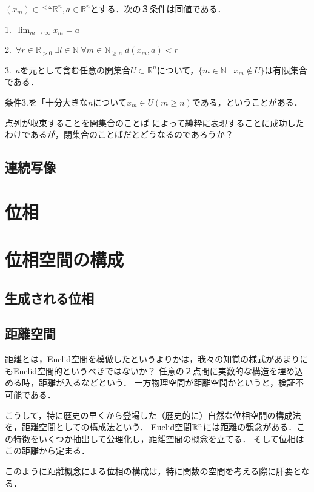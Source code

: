 \documentclass[uplatex, 12pt, dvipdfmx]{jsreport}
\begin{document}
\begin{proposition}[点列の収束の位相的特徴付け]\rm{}
    $(x_m)\in{}^{<\omega}\mathbb{R}^n, a\in\mathbb{R}^n$とする．次の３条件は同値である．

    1.\, $\lim_{m\to\infty}x_m=a$

    2.\, $\forall r\in\mathbb{R}_{>0}\;\exists l\in\mathbb{N}\;\forall m\in\mathbb{N}_{\ge n}\; d(x_m,a)<r$

    3.\, $a$を元として含む任意の開集合$U\subset\mathbb{R}^n$について，$\{m\in\mathbb{N}\mid x_m\notin U\}$は有限集合である．

    条件3.を「十分大きな$n$について$x_m\in U (m\ge n)$である，ということがある．
\end{proposition}
\begin{remark}
    点列が収束することを開集合のことば
    によって純粋に表現することに成功したわけであるが，閉集合のことばだとどうなるのであろうか？
\end{remark}

\section{連続写像}

\chapter{位相}

\chapter{位相空間の構成}

\section{生成される位相}

\section{距離空間}

\begin{screen}
    距離とは，Euclid空間を模倣したというよりかは，我々の知覚の様式があまりにもEuclid空間的というべきではないか？
    任意の２点間に実数的な構造を埋め込める時，距離が入るなどという．
    一方物理空間が距離空間かというと，検証不可能である．

    こうして，特に歴史の早くから登場した（歴史的に）自然な位相空間の構成法を，距離空間としての構成法という．
    Euclid空間$\mathbb{R}^n$には距離の観念がある．この特徴をいくつか抽出して公理化し，距離空間の概念を立てる．
    そして位相はこの距離から定まる．

    このように距離概念による位相の構成は，特に関数の空間を考える際に肝要となる．
\end{screen}
\end{document}
